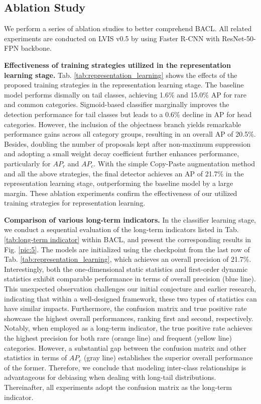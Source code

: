 \documentclass[lettersize,journal]{IEEEtran}
\begin{document}
\subsection{Ablation Study}

We perform a series of ablation studies to better comprehend BACL.
All related experiments are conducted on LVIS v0.5 by using Faster R-CNN with ResNet-50-FPN backbone.


\noindent\textbf{Effectiveness of training strategies utilized in the representation learning stage.}
Tab. \ref{tab:representation_learning} shows the effects of the proposed training strategies in the representation learning stage.
The baseline model performs dismally on tail classes, achieving 1.6\% and 15.0\% AP for rare and common categories.
Sigmoid-based classifier marginally improves the detection performance for tail classes but leads to a 0.6\% decline in AP for head categories.
However, the inclusion of the objectness branch yields remarkable performance gains across all category groups, resulting in an overall AP of 20.5\%.
Besides, doubling the number of proposals kept after non-maximum suppression and adopting a small weight decay coefficient further enhances performance, particularly for $AP_r$ and $AP_c$.
With the simple Copy-Paste augmentation method and all the above strategies, the final detector achieves an AP of 21.7\% in the representation learning stage, outperforming the baseline model by a large margin.
These ablation experiments confirm the effectiveness of our utilized training strategies for representation learning.

\noindent\textbf{Comparison of various long-term indicators.}
In the classifier learning stage, we conduct a sequential evaluation of the long-term indicators listed in Tab. \ref{tab:long-term indicator} within BACL, and present the corresponding results in Fig. \ref{pic:5}.
The models are initialized using the checkpoint from the last row of Tab. \ref{tab:representation_learning}, which achieves an overall precision of 21.7\%.
Interestingly, both the one-dimensional static statistics and first-order dynamic statistics exhibit comparable performance in terms of overall precision (blue line).
This unexpected observation challenges our initial conjecture and earlier research, indicating that within a well-designed framework, these two types of statistics can have similar impacts.
Furthermore, the confusion matrix and true positive rate showcase the highest overall performances, ranking first and second, respectively.
Notably, when employed as a long-term indicator, the true positive rate achieves the highest precision for both rare (orange line) and frequent (yellow line) categories.
However, a substantial gap between the confusion matrix and other statistics in terms of $AP_c$ (gray line) establishes the superior overall performance of the former.
Therefore, we conclude that modeling inter-class relationships is advantageous for debiasing when dealing with long-tail distributions.
Thereinafter, all experiments adopt the confusion matrix as the long-term indicator.
\end{document}
